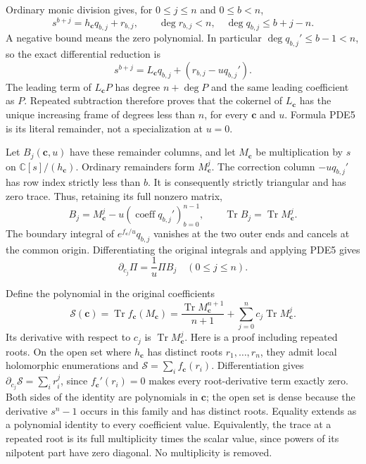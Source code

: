 \documentclass[11pt,a4paper]{article}
\begin{document}
Ordinary monic division gives, for $0\leq j\leq n$ and $0\leq b<n$,
\[
 s^{b+j}=h_{\mathbf c}q_{b,j}+r_{b,j},\qquad
 \deg r_{b,j}<n,\quad\deg q_{b,j}\leq b+j-n.
 \tag{PDE4}
\]
A negative bound means the zero polynomial. In particular
$\deg q_{b,j}'\leq b-1<n$, so the exact differential reduction is
\[
 s^{b+j}=L_{\mathbf c}q_{b,j}
                    +(r_{b,j}-u q_{b,j}').
 \tag{PDE5}
\]
The leading term of $L_{\mathbf c}P$ has degree $n+\deg P$ and the same
leading coefficient as $P$. Repeated subtraction therefore proves that
the cokernel of $L_{\mathbf c}$ has the unique increasing frame of
degrees less than $n$, for every $\mathbf c$ and $u$. Formula PDE5 is
its literal remainder, not a specialization at $u=0$.

Let $B_j(\mathbf c,u)$ have these remainder columns, and let
$M_{\mathbf c}$ be multiplication by $s$ on
$\mathbb{C}[s]/(h_{\mathbf c})$. Ordinary remainders form
$M_{\mathbf c}^j$. The correction column $-u q_{b,j}'$ has row index
strictly less than $b$. It is consequently strictly triangular and has
zero trace. Thus, retaining its full nonzero matrix,
\[
 B_j=M_{\mathbf c}^{j}-u(\operatorname{coeff}q_{b,j}')_{b=0}^{n-1},
 \qquad \operatorname{Tr}B_j=\operatorname{Tr}M_{\mathbf c}^{j}.
 \tag{PDE6}
\]
The boundary integral of $e^{f_{\mathbf c}/u}q_{b,j}$ vanishes at
the two outer ends and cancels at the common origin. Differentiating
the original integrals and applying PDE5 gives
\[
 \partial_{c_j}\Pi=\frac1u\Pi B_j\quad(0\leq j\leq n).
 \tag{PDE7}
\]

Define the polynomial in the original coefficients
\[
 \mathcal S(\mathbf c)
  =\operatorname{Tr} f_{\mathbf c}(M_{\mathbf c})
  =\frac{\operatorname{Tr}M_{\mathbf c}^{n+1}}{n+1}
                +\sum_{j=0}^n c_j\operatorname{Tr}M_{\mathbf c}^j.
 \tag{PDE8}
\]
Its derivative with respect to $c_j$ is
$\operatorname{Tr}M_{\mathbf c}^j$. Here is a proof including repeated
roots. On the open set where $h_{\mathbf c}$ has distinct roots
$r_1,\ldots,r_n$, they admit local holomorphic enumerations and
$\mathcal S=\sum_i f_{\mathbf c}(r_i)$. Differentiation gives
$\partial_{c_j}\mathcal S=\sum_i r_i^j$, since
$f_{\mathbf c}'(r_i)=0$ makes every root-derivative term exactly zero.
Both sides of the identity are polynomials in $\mathbf c$; the open
set is dense because the derivative $s^n-1$ occurs in this family
and has distinct roots. Equality extends as a polynomial identity to
every coefficient value. Equivalently, the trace at a repeated root
is its full multiplicity times the scalar value, since powers of its
nilpotent part have zero diagonal. No multiplicity is removed.
\end{document}
